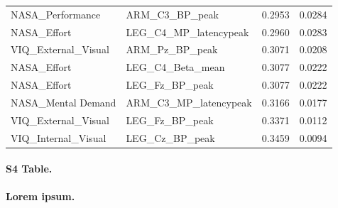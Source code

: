 \documentclass[10pt,letterpaper]{article}
\begin{document}
\begin{longtable}{@{}llll@{}}
NASA\_Performance & ARM\_C3\_BP\_peak & 0.2953 & 0.0284 \\
\rowcolor[HTML]{EFEFEF} 
NASA\_Effort & LEG\_C4\_MP\_latencypeak & 0.2960 & 0.0283 \\
VIQ\_External\_Visual & ARM\_Pz\_BP\_peak & 0.3071 & 0.0208 \\
\rowcolor[HTML]{EFEFEF} 
NASA\_Effort & LEG\_C4\_Beta\_mean & 0.3077 & 0.0222 \\
NASA\_Effort & LEG\_Fz\_BP\_peak & 0.3077 & 0.0222 \\
\rowcolor[HTML]{EFEFEF} 
NASA\_Mental Demand & ARM\_C3\_MP\_latencypeak & 0.3166 & 0.0177 \\
VIQ\_External\_Visual & LEG\_Fz\_BP\_peak & 0.3371 & 0.0112 \\
\rowcolor[HTML]{EFEFEF} 
VIQ\_Internal\_Visual & LEG\_Cz\_BP\_peak & 0.3459 & 0.0094 \\ \bottomrule
\end{longtable}



\paragraph*{S4 Table.}
\label{S4_Table}
{\bf Lorem ipsum.} 
\end{document}
